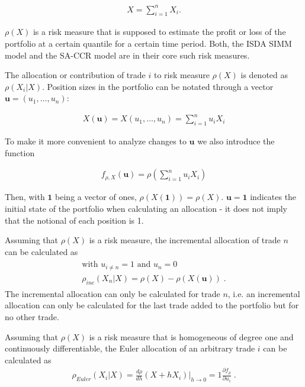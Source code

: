 \documentclass[../Thesis_AHoecherl.tex]{subfiles}
\begin{document}
\begin{align}
    X = \sum_{i=1}^n{X_i} \text{.}
\end{align}

$\rho(X)$ is a risk measure that is supposed to estimate the profit or loss of the portfolio at a certain quantile for a certain time period. 
Both, the \gls{ISDA SIMM} model and the \gls{SA-CCR} model are in their core such risk measures.

The allocation or contribution of trade $i$ to risk measure $\rho(X)$ is denoted as $\rho\left(X_i|X\right)$. Position sizes in the portfolio can be notated through a vector $\mathbf{u} = (u_1,\dots, u_n)$:

\begin{align}
    \label{eq: u formula}
    X(\mathbf{u}) = X(u_1, \dots, u_n) = \sum_{i=1}^{n}{u_iX_i}
\end{align}

To make it more convenient to analyze changes to $\mathbf{u}$ we also introduce the function

\begin{align}
    f_{\rho,X}\left(\mathbf{u}\right) = \rho\left(\sum_{i=1}^{n}{u_iX_i}\right)
\end{align}

Then, with $\mathbf{1}$ being a vector of ones, $\rho\left(X\left(\mathbf{1}\right)\right) = \rho\left(X\right)$. $\mathbf{u} = \mathbf{1}$ indicates the initial state of the portfolio when calculating an allocation - it does not imply that the notional of each position is 1.

\begin{definition}
    Assuming that $\rho\left(X\right)$ is a risk measure, the incremental allocation of trade $n$ can be calculated as
    \begin{gather}
        \begin{split}
            \text{with } u_{i\neq n} = 1 \text{ and }u_n = 0\\
            \rho_{inc}\left(X_n|X\right) = \rho\left(X\right) - \rho\left(X\left(\mathbf{u}\right)\right)\; \text{.}
        \end{split}
    \end{gather}
    The incremental allocation can only be calculated for trade $n$, i.e. an incremental allocation can only be calculated for the last trade added to the portfolio but for no other trade.
\end{definition}

\begin{definition}
    Assuming that $\rho\left(X\right)$ is a risk measure that is homogeneous of degree one and continuously differentiable, the Euler allocation of an arbitrary trade $i$ can be calculated as
    \begin{gather}
        \label{eq:Euler allocation}
        \rho_{Euler}\left(X_i|X\right) = \frac{d\rho}{dh}\left(X+hX_i\right)|_{h\rightarrow0} = 1\frac{\partial f_{\rho}}{\partial u_i}  \; \text{.}
    \end{gather}
\end{definition}
\end{document}
